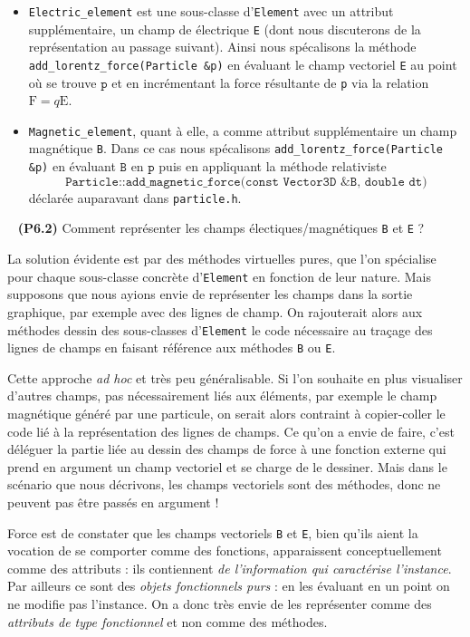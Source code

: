 \documentclass[12pt, letterpaper, twoside]{article}
\newcommand{\T}[1]{\texttt{#1}}
\begin{document}
\begin{itemize}
\item \T{Electric\_element} est une sous-classe d'\T{Element} avec un attribut supplémentaire, un champ de électrique \T{E} (dont nous discuterons de la représentation au passage suivant). Ainsi nous spécalisons la méthode \T{add\_lorentz\_force(Particle \&p)} en évaluant le champ vectoriel \T{E} au point où se trouve $\T{p}$ et en incrémentant la force résultante de \T{p} via la relation $\boldsymbol{\mathrm{F}}=q\boldsymbol{\mathrm{E}}$.

\item \T{Magnetic\_element}, quant à elle, a comme attribut supplémentaire un champ magnétique \T{B}. Dans ce cas nous spécalisons \T{add\_lorentz\_force(Particle \&p)} en évaluant $\T{B}$ en $\T{p}$ puis en appliquant la méthode relativiste $$\T{Particle::add\_magnetic\_force(const Vector3D \&B, double dt)}$$ déclarée auparavant dans \T{particle.h}.

\end{itemize}

\ \linebreak
\textbf{(P6.2)} Comment représenter les champs électiques/magnétiques \T{B} et \T{E} ?

La solution évidente est par des méthodes virtuelles pures, que l'on spécialise pour chaque sous-classe concrète d'\T{Element} en fonction de leur nature. Mais supposons que nous ayions envie de représenter les champs dans la sortie graphique, par exemple avec des lignes de champ. On rajouterait alors aux méthodes dessin des sous-classes d'\T{Element} le code nécessaire au traçage des lignes de champs en faisant référence aux méthodes \T{B} ou \T{E}.

Cette approche \textit{ad hoc} et très peu généralisable. Si l'on souhaite en plus visualiser d'autres champs, pas nécessairement liés aux éléments, par exemple le champ magnétique généré par une particule, on serait alors contraint à copier-coller le code lié à la représentation des lignes de champs. Ce qu'on a envie de faire, c'est déléguer la partie liée au dessin des champs de force à une fonction externe qui prend en argument un champ vectoriel et se charge de le dessiner. Mais dans le scénario que nous décrivons, les champs vectoriels sont des méthodes, donc ne peuvent pas être passés en argument !

Force est de constater que les champs vectoriels \T{B} et \T{E}, bien qu'ils aient la vocation de se comporter comme des fonctions, apparaissent conceptuellement comme des attributs : ils contiennent \textit{de l'information qui caractérise l'instance}. Par ailleurs ce sont des \textit{objets fonctionnels purs} : en les évaluant en un point on ne modifie pas l'instance. On a donc très envie de les représenter comme des \textit{attributs de type fonctionnel} et non comme des méthodes.
\end{document}

